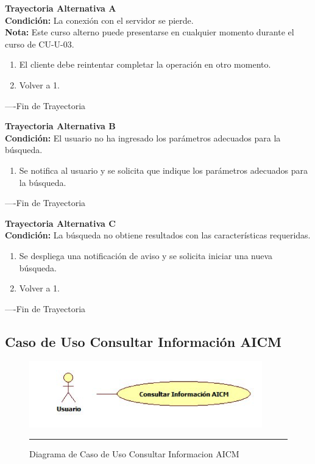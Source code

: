 \begin{flushleft}
	\hypertarget{TrayectoriaA_CU-U-03}{}
	\textbf{Trayectoria Alternativa A}\\
	\textbf{Condición:} La conexión con el servidor se pierde. \\
	\textbf{Nota: } Este curso alterno puede presentarse en cualquier momento durante el curso de CU-U-03. \\	
	\begin{enumerate}
		\item El cliente debe reintentar completar la operación en otro momento. 
		\item Volver a 1. 
	\end{enumerate}
\end{flushleft}
----Fin de Trayectoria

\begin{flushleft}
	\hypertarget{TrayectoriaB_CU-U-03}{}
	\textbf{Trayectoria Alternativa B}\\
	\textbf{Condición:} El usuario no ha ingresado los parámetros adecuados para la búsqueda. \\
	\begin{enumerate}
		\item  Se notifica al usuario y se solicita que indique los parámetros adecuados para la búsqueda.
	\end{enumerate}
\end{flushleft}
----Fin de Trayectoria

\begin{flushleft}
	\hypertarget{TrayectoriaC_CU-U-03}{}
	\textbf{Trayectoria Alternativa C}\\
	\textbf{Condición:} La búsqueda no obtiene resultados con las características requeridas. \\
	\begin{enumerate}
		\item Se despliega una notificación de aviso y se solicita iniciar una nueva búsqueda. 
		\item Volver a 1.
	\end{enumerate}
\end{flushleft}
----Fin de Trayectoria

\subsection{Caso de Uso Consultar Información AICM}

\begin{figure}[htbp]
	\centering
		\includegraphics[width=0.9\textwidth]{Figuras/cuConsultarInformacionAICM.png}
		\rule{30em}{0.5pt}
	\caption[Diagrama de Caso de Uso Consultar Informacion AICM]{Diagrama de Caso de Uso Consultar Informacion AICM}
	\label{fig:cuConsultarInformacionAICM}
\end{figure}

